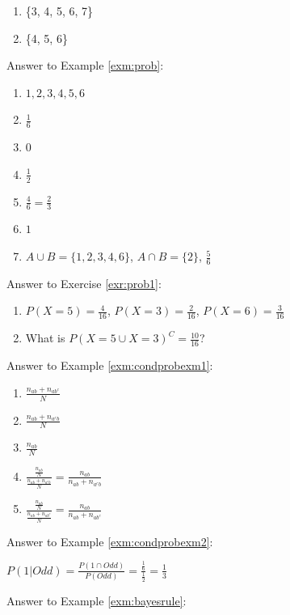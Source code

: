 \documentclass[]{book}
\providecommand{\tightlist}{%
  \setlength{\itemsep}{0pt}\setlength{\parskip}{0pt}}
\theoremstyle{definition}
\theoremstyle{definition}
\theoremstyle{definition}
\theoremstyle{remark}
\begin{document}
\begin{enumerate}
\def\labelenumi{\arabic{enumi}.}
\tightlist
\item
  \{3, 4, 5, 6, 7\}
\item
  \{4, 5, 6\}
\end{enumerate}

Answer to Example \ref{exm:prob}:

\begin{enumerate}
\def\labelenumi{\arabic{enumi}.}
\item
  \({1, 2, 3, 4, 5, 6}\)
\item
  \(\frac{1}{6}\)
\item
  \(0\)
\item
  \(\frac{1}{2}\)
\item
  \(\frac{4}{6} = \frac{2}{3}\)
\item
  \(1\)
\item
  \(A\cup B=\{1, 2, 3, 4, 6\}\), \(A\cap B=\{2\}\), \(\frac{5}{6}\)
\end{enumerate}

Answer to Exercise \ref{exr:prob1}:

\begin{enumerate}
\def\labelenumi{\arabic{enumi}.}
\item
  \(P(X = 5) = \frac{4}{16}\), \(P(X = 3) = \frac{2}{16}\),
  \(P(X = 6) = \frac{3}{16}\)
\item
  What is \(P(X=5 \cup X = 3)^C = \frac{10}{16}\)?
\end{enumerate}

Answer to Example \ref{exm:condprobexm1}:

\begin{enumerate}
\def\labelenumi{\arabic{enumi}.}
\item
  \(\frac{n_{ab} + n_{ab^c}}{N}\)
\item
  \(\frac{n_{ab} + n_{a^cb}}{N}\)
\item
  \(\frac{n_{ab}}{N}\)
\item
  \(\frac{\frac{n_{ab}}{N}}{\frac{n_{ab} + n_{a^cb}}{N}} = \frac{n_{ab}}{n_{ab} + n_{a^cb}}\)
\item
  \(\frac{\frac{n_{ab}}{N}}{\frac{n_{ab} + n_{ab^c}}{N}} = \frac{n_{ab}}{n_{ab} + n_{ab^c}}\)
\end{enumerate}

Answer to Example \ref{exm:condprobexm2}:

\(P(1|Odd) = \frac{P(1 \cap Odd)}{P(Odd)} = \frac{\frac{1}{6}}{\frac{1}{2}} = \frac{1}{3}\)

Answer to Example \ref{exm:bayesrule}:
\end{document}
